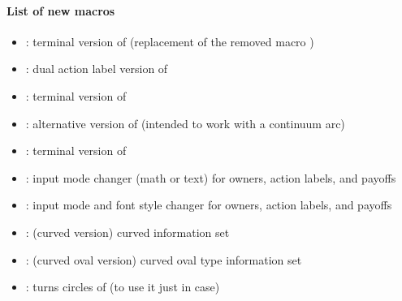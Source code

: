 \paragraph{List of new macros}
\begin{itemize}\tightlist
\item \cmd{\istbt(*)}: terminal version of \cmd{\istb(*)} 
      (replacement of the removed macro )
\item \cmd{\istB(*)}: dual action label version of \cmd{\istb(*)}
\item \cmd{\istBt(*)}: terminal version of \cmd{\istB(*)}
\item \cmd{\istbA(*)}: alternative version of \cmd{\istb(*)} (intended to work with a continuum arc)
\item \cmd{\istbAt(*)}: terminal version of \cmd{\istbA(*)}
%
\listdivider

\item \cmd{\setistmathTF}: input mode changer (math or text) for owners, action labels, and payoffs
\item \cmd{\setistmathTF*}: input mode and font style changer for owners, action labels, and payoffs
%
\listdivider

\item \cmd{\xtCInfoset}: (curved version) curved information set
\item \cmd{\xtCInfosetO}: (curved oval version) curved oval type information set
\item \cmd{\xtCInfosetOTurnX}: turns  circles of \cmd{\xtCInfosetO} (to use it just in case)
%
\listdivider


\end{itemize}
